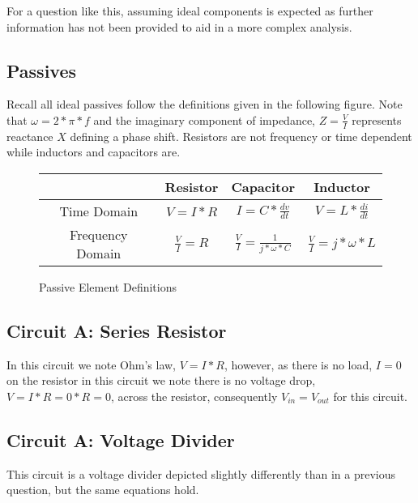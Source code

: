 \documentclass[main.tex]{subfiles}
\begin{document}
\spoilerline

\noindent For a question like this, assuming ideal components is expected as further information has not been provided to aid in a more complex analysis.

\subsection{Passives}
Recall all ideal passives follow the definitions given in the following figure. Note that $\omega = 2 * \pi * f$ and the imaginary component of impedance, $Z = \frac{V}{I}$ represents reactance $X$ defining a phase shift. Resistors are not frequency or time dependent while inductors and capacitors are. 
\begin{figure}[h!]
    \centering
    \begin{tabular}{|c|c|c|c|}
        \hline
         & Resistor & Capacitor & Inductor \\ \hline
        Time Domain & $V = I * R$ & $I = C * \frac{dv}{dt}$ & $V = L * \frac{di}{dt}$ \\ \hline
        Frequency Domain & $\frac{V}{I} = R$ & $\frac{V}{I} = \frac{1}{j*\omega*C}$ & $\frac{V}{I} = j*\omega*L$ \\ \hline
    \end{tabular}
    \caption{Passive Element Definitions}
    \label{fig:passive definitions}
\end{figure}

\subsection{Circuit A: Series Resistor}
In this circuit we note Ohm's law, $V = I * R$, however, as there is no load, $I=0$ on the resistor in this circuit we note there is no voltage drop, $V=I*R=0*R=0$, across the resistor, consequently $V_{in} = V_{out}$ for this circuit. 


\subsection{Circuit A: Voltage Divider}
This circuit is a voltage divider depicted slightly differently than in a previous question, but the same equations hold. 
\end{document}
